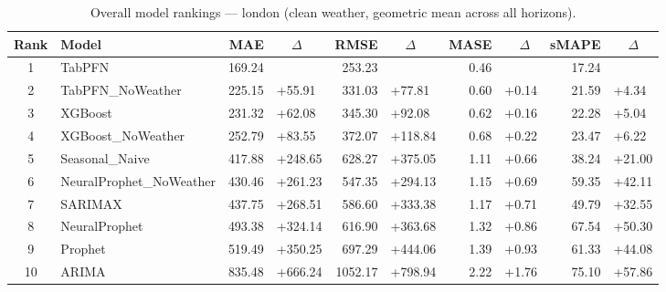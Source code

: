 \begin{table}[ht!]
\centering
\caption{Overall model rankings — london (clean weather, geometric mean across all horizons).}
\label{tab:overall_rankings_london}
{\small
\setlength{\tabcolsep}{3pt}
\scriptsize
\begin{tabular}{clrlrlrlrl}
\toprule
Rank & Model & MAE & ~~\(\Delta\) & RMSE & ~~\(\Delta\) & MASE & ~~\(\Delta\) & sMAPE & ~~\(\Delta\) \\
\midrule
1 & TabPFN & 169.24 &  & 253.23 &  & 0.46 &  & 17.24 &  \\
2 & TabPFN\_NoWeather & 225.15 & +55.91 & 331.03 & +77.81 & 0.60 & +0.14 & 21.59 & +4.34 \\
3 & XGBoost & 231.32 & +62.08 & 345.30 & +92.08 & 0.62 & +0.16 & 22.28 & +5.04 \\
4 & XGBoost\_NoWeather & 252.79 & +83.55 & 372.07 & +118.84 & 0.68 & +0.22 & 23.47 & +6.22 \\
5 & Seasonal\_Naive & 417.88 & +248.65 & 628.27 & +375.05 & 1.11 & +0.66 & 38.24 & +21.00 \\
6 & NeuralProphet\_NoWeather & 430.46 & +261.23 & 547.35 & +294.13 & 1.15 & +0.69 & 59.35 & +42.11 \\
7 & SARIMAX & 437.75 & +268.51 & 586.60 & +333.38 & 1.17 & +0.71 & 49.79 & +32.55 \\
8 & NeuralProphet & 493.38 & +324.14 & 616.90 & +363.68 & 1.32 & +0.86 & 67.54 & +50.30 \\
9 & Prophet & 519.49 & +350.25 & 697.29 & +444.06 & 1.39 & +0.93 & 61.33 & +44.08 \\
10 & ARIMA & 835.48 & +666.24 & 1052.17 & +798.94 & 2.22 & +1.76 & 75.10 & +57.86 \\
\bottomrule
\end{tabular}
}
\end{table}
